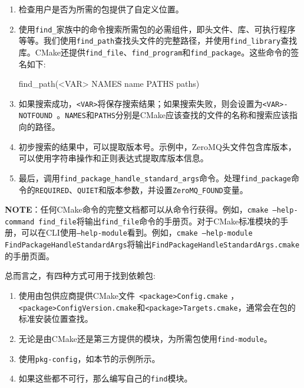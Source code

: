\begin{enumerate}
\item 检查用户是否为所需的包提供了自定义位置。

\item 使用\texttt{find\_}家族中的命令搜索所需包的必需组件，即头文件、库、可执行程序等等。我们使用\texttt{find\_path}查找头文件的完整路径，并使用\texttt{find\_library}查找库。CMake还提供\texttt{find\_file}、\texttt{find\_program}和\texttt{find\_package}。这些命令的签名如下:

\begin{codebox}[cmake]
find_path(<VAR> NAMES name PATHS paths)
\end{codebox}

\item 如果搜索成功，\texttt{<VAR>}将保存搜索结果；如果搜索失败，则会设置为\texttt{<VAR>-NOTFOUND }。\texttt{NAMES}和\texttt{PATHS}分别是CMake应该查找的文件的名称和搜索应该指向的路径。

\item 初步搜索的结果中，可以提取版本号。示例中，ZeroMQ头文件包含库版本，可以使用字符串操作和正则表达式提取库版本信息。

\item 最后，调用\texttt{find\_package\_handle\_standard\_args}命令。处理\texttt{find\_package}命令的\texttt{REQUIRED}、\texttt{QUIET}和版本参数，并设置\texttt{ZeroMQ\_FOUND}变量。

\end{enumerate}

\begin{myInfoBox}
\textbf{NOTE}：任何CMake命令的完整文档都可以从命令行获得。例如，\texttt{cmake --help-command find\_file}将输出\texttt{find\_file}命令的手册页。对于CMake标准模块的手册，可以在CLI使用\texttt{--help-module}看到。例如，\texttt{cmake --help-module FindPackageHandleStandardArgs}将输出\texttt{FindPackageHandleStandardArgs.cmake}的手册页面。
\end{myInfoBox}


总而言之，有四种方式可用于找到依赖包:

\begin{enumerate}
\item 使用由包供应商提供CMake文件\texttt{ <package>Config.cmake} ，\texttt{<package>ConfigVersion.cmake}和\texttt{<package>Targets.cmake}，通常会在包的标准安装位置查找。

\item 无论是由CMake还是第三方提供的模块，为所需包使用\texttt{find-module}。

\item 使用\texttt{pkg-config}，如本节的示例所示。

\item 如果这些都不可行，那么编写自己的\texttt{find}模块。

\end{enumerate}

